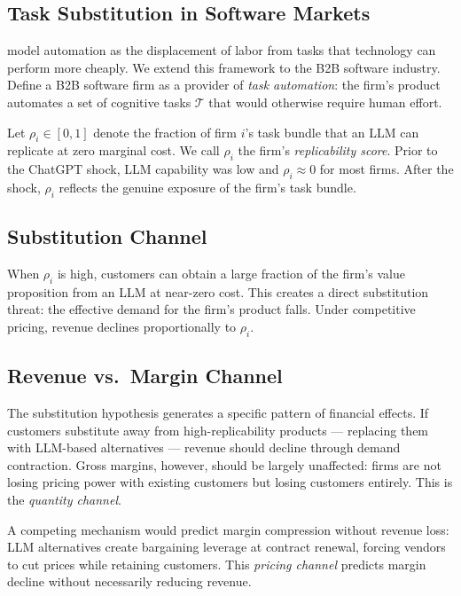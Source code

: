 \documentclass[12pt,a4paper]{article}
\begin{document}
\subsection{Task Substitution in Software Markets}

\citet{acemoglu2022} model automation as the displacement of labor from tasks that technology can perform more cheaply. We extend this framework to the B2B software industry. Define a B2B software firm as a provider of \emph{task automation}: the firm's product automates a set of cognitive tasks $\mathcal{T}$ that would otherwise require human effort.

Let $\rho_i \in [0,1]$ denote the fraction of firm $i$'s task bundle that an LLM can replicate at zero marginal cost. We call $\rho_i$ the firm's \emph{replicability score}. Prior to the ChatGPT shock, LLM capability was low and $\rho_i \approx 0$ for most firms. After the shock, $\rho_i$ reflects the genuine exposure of the firm's task bundle.

\subsection{Substitution Channel}

When $\rho_i$ is high, customers can obtain a large fraction of the firm's value proposition from an LLM at near-zero cost. This creates a direct substitution threat: the effective demand for the firm's product falls. Under competitive pricing, revenue declines proportionally to $\rho_i$.

\subsection{Revenue vs.\ Margin Channel}

The substitution hypothesis generates a specific pattern of financial effects. If customers substitute away from high-replicability products --- replacing them with LLM-based alternatives --- revenue should decline through demand contraction. Gross margins, however, should be largely unaffected: firms are not losing pricing power with existing customers but losing customers entirely. This is the \emph{quantity channel}.

A competing mechanism would predict margin compression without revenue loss: LLM alternatives create bargaining leverage at contract renewal, forcing vendors to cut prices while retaining customers. This \emph{pricing channel} predicts margin decline without necessarily reducing revenue.
\end{document}
